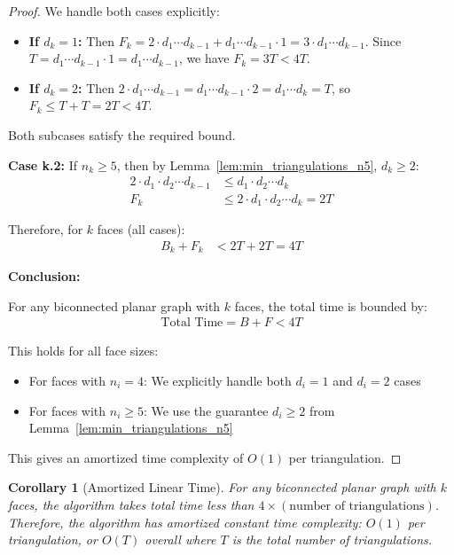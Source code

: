 \documentclass[12pt,a4paper]{article}
\newtheorem{corollary}[theorem]{Corollary}
\theoremstyle{definition}
\theoremstyle{remark}
\begin{document}
\begin{proof}
We handle both cases explicitly:
\begin{itemize}
    \item \textbf{If $d_k = 1$:} Then $F_k = 2 \cdot d_1 \cdots d_{k-1} + d_1 \cdots d_{k-1} \cdot 1 = 3 \cdot d_1 \cdots d_{k-1}$. Since $T = d_1 \cdots d_{k-1} \cdot 1 = d_1 \cdots d_{k-1}$, we have $F_k = 3T < 4T$.
    \item \textbf{If $d_k = 2$:} Then $2 \cdot d_1 \cdots d_{k-1} = d_1 \cdots d_{k-1} \cdot 2 = d_1 \cdots d_k = T$, so $F_k \leq T + T = 2T < 4T$.
\end{itemize}

Both subcases satisfy the required bound.

\textbf{Case k.2:} If $n_k \geq 5$, then by Lemma~\ref{lem:min_triangulations_n5}, $d_k \geq 2$:
\begin{align}
2 \cdot d_1 \cdot d_2 \cdots d_{k-1} &\leq d_1 \cdot d_2 \cdots d_k \\
F_k &\leq 2 \cdot d_1 \cdot d_2 \cdots d_k = 2T
\end{align}

Therefore, for $k$ faces (all cases):
\begin{align}
B_k + F_k &< 2T + 2T = 4T
\end{align}

\vspace{0.3cm}
\noindent\textbf{Conclusion:}

For any biconnected planar graph with $k$ faces, the total time is bounded by:
\begin{align}
\text{Total Time} = B + F < 4T
\end{align}

This holds for all face sizes:
\begin{itemize}
    \item For faces with $n_i = 4$: We explicitly handle both $d_i = 1$ and $d_i = 2$ cases
    \item For faces with $n_i \geq 5$: We use the guarantee $d_i \geq 2$ from Lemma~\ref{lem:min_triangulations_n5}
\end{itemize}

This gives an amortized time complexity of $O(1)$ per triangulation.
\end{proof}

\begin{corollary}[Amortized Linear Time]
For any biconnected planar graph with $k$ faces, the algorithm takes total time less than $4 \times (\text{number of triangulations})$. Therefore, the algorithm has amortized constant time complexity: $O(1)$ per triangulation, or $O(T)$ overall where $T$ is the total number of triangulations.
\end{corollary}
\end{document}
